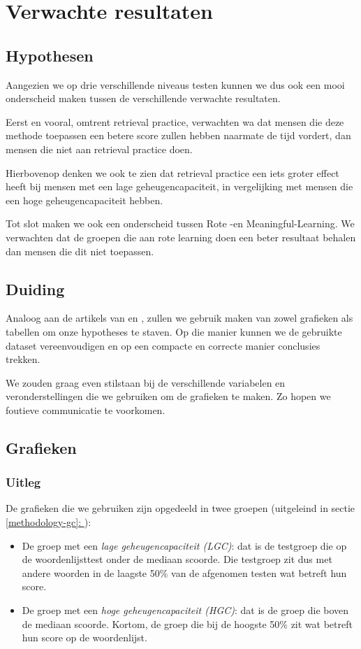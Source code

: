 \documentclass{hogent-article}
\newcommand{\customref}[1]{\underline{\ref{#1}: \nameref{#1}}}
\begin{document}
\section{Verwachte resultaten}

\subsection{Hypothesen}

Aangezien we op drie verschillende niveaus testen kunnen we dus ook een mooi onderscheid maken tussen de verschillende verwachte resultaten.

Eerst en vooral, omtrent retrieval practice, verwachten wa dat mensen die deze methode toepassen een betere score zullen hebben naarmate de tijd vordert, dan mensen die niet aan retrieval practice doen.

Hierbovenop denken we ook te zien dat retrieval practice een iets groter effect heeft bij mensen met een lage geheugencapaciteit, in vergelijking met mensen die een hoge geheugencapaciteit hebben.

Tot slot maken we ook een onderscheid tussen Rote -en Meaningful-Learning. We verwachten dat de groepen die aan rote learning doen een beter resultaat behalen dan mensen die dit niet toepassen. 

\subsection{Duiding}

Analoog aan de artikels van \cite{HenryRoediger2006} en \cite{Agarwal2008}, zullen we gebruik maken van zowel grafieken als tabellen om onze hypotheses te staven. Op die manier kunnen we de gebruikte dataset vereenvoudigen en op een compacte en correcte manier conclusies trekken.\\
\par
\noindent
We zouden graag even stilstaan bij de verschillende variabelen en veronderstellingen die we gebruiken om de grafieken te maken. Zo hopen we foutieve communicatie te voorkomen.

\subsection{Grafieken}
\subsubsection{Uitleg}
De grafieken die we gebruiken zijn opgedeeld in twee groepen (uitgeleind in sectie \customref{methodology-gc}):
\begin{itemize}
	\item De groep met een \textit{lage geheugencapaciteit (LGC)}: dat is de testgroep die op de woordenlijsttest onder de mediaan scoorde. Die testgroep zit dus met andere woorden in de laagste 50\% van de afgenomen testen wat betreft hun score.
	\item De groep met een \textit{hoge geheugencapaciteit (HGC)}: dat is de groep die boven de mediaan scoorde. Kortom, de groep die bij de hoogste 50\% zit wat betreft hun score op de woordenlijst.
\end{itemize}
\end{document}
